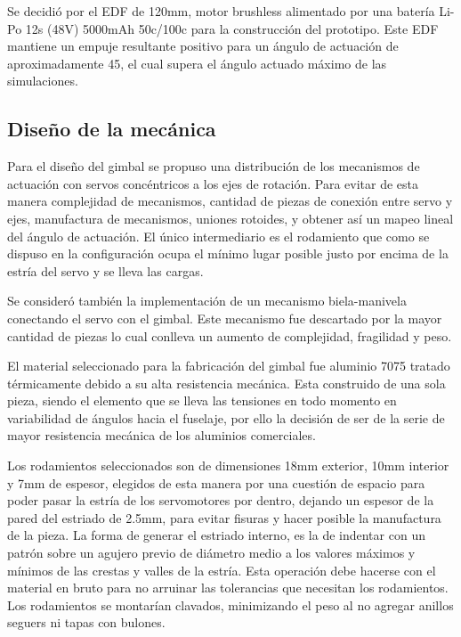 \medskip

Se decidió por el EDF de 120mm, motor brushless alimentado por una batería Li-Po 12s (48V) 5000mAh 50c/100c para la construcción del prototipo. Este EDF mantiene un empuje resultante positivo para un ángulo de actuación de aproximadamente 45\grad , el cual supera el ángulo actuado máximo de las simulaciones.







\subsection{Diseño de la mecánica}

Para el diseño del gimbal se propuso una distribución de los mecanismos de actuación con
servos concéntricos a los ejes de rotación. Para evitar de esta manera complejidad de
mecanismos, cantidad de piezas de conexión entre servo y ejes, manufactura de mecanismos,
uniones rotoides, y obtener así un mapeo lineal del ángulo de actuación. El único intermediario
es el rodamiento que como se dispuso en la configuración ocupa el mínimo lugar posible justo
por encima de la estría del servo y se lleva las cargas. 

Se consideró también la implementación de un mecanismo biela-manivela conectando el servo con el gimbal. Este mecanismo fue descartado por la mayor cantidad de piezas lo cual conlleva un aumento de complejidad, fragilidad y peso. 

\medskip

El material seleccionado para la fabricación del gimbal fue aluminio 7075 tratado térmicamente debido a su alta resistencia mecánica. Esta construido de una sola pieza, siendo el elemento que se lleva las tensiones
en todo momento en variabilidad de ángulos hacia el fuselaje, por ello la decisión de ser de la
serie de mayor resistencia mecánica de los aluminios comerciales.

\medskip

Los rodamientos seleccionados son de dimensiones 18mm exterior, 10mm interior y 7mm de espesor,
elegidos de esta manera por una cuestión de espacio para poder pasar la estría de los
servomotores por dentro, dejando un espesor de la pared del estriado de 2.5mm,
para evitar fisuras y hacer posible la manufactura de la pieza. La forma de generar el estriado
interno, es la de indentar con un patrón sobre un agujero previo de diámetro medio a los
valores máximos y mínimos de las crestas y valles de la estría. Esta operación debe hacerse con
el material en bruto para no arruinar las tolerancias que necesitan los rodamientos. Los
rodamientos se montarían clavados, minimizando el peso al no agregar anillos seguers ni tapas con
bulones.

